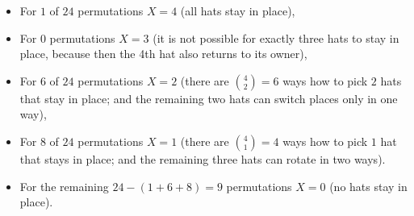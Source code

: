 \documentclass[jou]{apa6}
\begin{document}
\begin{itemize}
\item For $1$ of $24$ permutations $X = 4$ (all hats stay in place),
\item For $0$ permutations $X = 3$ (it is not possible for exactly three hats to stay in place, because
then the 4th hat also returns to its owner),
\item For $6$ of $24$ permutations $X = 2$ (there are ${4 \choose 2} = 6$ ways how to pick $2$ hats
that stay in place; and the remaining two hats can switch places only in one way),
\item For $8$ of $24$ permutations $X = 1$ (there are ${4 \choose 1} = 4$ ways how to pick $1$ hat
that stays in place; and the remaining three hats can rotate in two ways). 
\item For the remaining $24 - (1 + 6 + 8) = 9$ permutations $X = 0$ (no hats stay in place).
\end{itemize}
\end{document}
